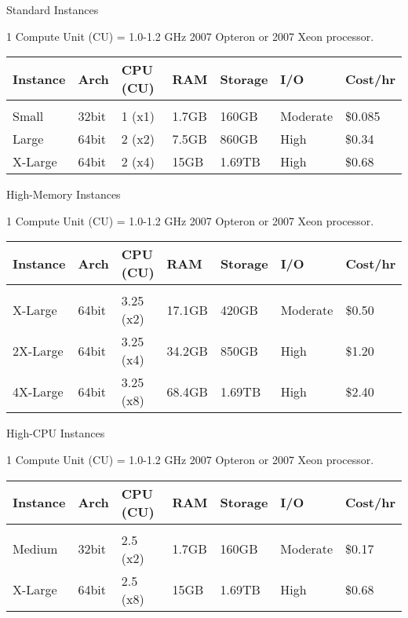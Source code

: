 \begin{nologo}
\begin{frame}{Standard Instances}
\begin{definition}
1 Compute Unit (CU) = 1.0-1.2 GHz 2007 Opteron or 2007 Xeon processor.
\end{definition}
\begin{center}
	\small
	\begin{tabular}{ l  l  l  l  l  l  l }
	  Instance & Arch & CPU (CU) & RAM & Storage & I/O & Cost/hr \\\hline \\ [-1.5ex]
	  Small     & 32bit & 1 (x1) & 1.7GB & 160GB & Moderate & \$0.085 \\ [1.5ex]
	  Large     & 64bit & 2 (x2) & 7.5GB & 860GB & High & \$0.34 \\ [1.5ex]
	  X-Large   & 64bit & 2 (x4) & 15GB & 1.69TB & High & \$0.68 \\ [1.5ex]
	\end{tabular}
\end{center}
\end{frame}

\begin{frame}{High-Memory Instances}
\begin{definition}
1 Compute Unit (CU) = 1.0-1.2 GHz 2007 Opteron or 2007 Xeon processor.
\end{definition}
\begin{center}
	\small
	\begin{tabular}{ l  l  l  l  l  l  l }
	  Instance & Arch & CPU (CU) & RAM & Storage & I/O & Cost/hr \\\hline \\ [-1.5ex]
	  X-Large     & 64bit & 3.25 (x2) & 17.1GB & 420GB & Moderate & \$0.50 \\ [1.5ex]
	  2X-Large    & 64bit & 3.25 (x4) & 34.2GB & 850GB & High & \$1.20 \\ [1.5ex]
	  4X-Large    & 64bit & 3.25 (x8) & 68.4GB & 1.69TB & High & \$2.40 \\ [1.5ex]
	\end{tabular}
\end{center}
\end{frame}

\begin{frame}{High-CPU Instances}
\begin{definition}
1 Compute Unit (CU) = 1.0-1.2 GHz 2007 Opteron or 2007 Xeon processor.
\end{definition}
\begin{center}
	\small
	\begin{tabular}{ l  l  l  l  l  l  l }
	  Instance & Arch & CPU (CU) & RAM & Storage & I/O & Cost/hr \\\hline \\ [-1.5ex]
	  Medium   & 32bit & 2.5 (x2) & 1.7GB & 160GB & Moderate & \$0.17 \\ [1.5ex]
	  X-Large  & 64bit & 2.5 (x8) & 15GB & 1.69TB & High & \$0.68 \\ [1.5ex]
	\end{tabular}
\end{center}
\end{frame}
\end{nologo}
